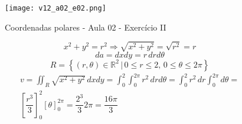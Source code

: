 \begin{enumerate}
	\begin{figure}[htb]
		\caption{Coordenadas polares - Aula 02 - Exercício II}
		\label{v12_a02_e02}
		\centering
		\texttt{[image: v12\_a02\_e02.png]}		
	\end{figure}	
	
	\begin{equation*}
		x^2 + y^2 = r^2 \Rightarrow \sqrt{x^2 + y^2} = \sqrt{r^2} = r
	\end{equation*}
	\begin{equation*}
		da = dx dy = r\, dr d\theta
	\end{equation*}
	\begin{equation*}
		R = \left\{(r, \theta) \in \mathbb{R}^2 \,|\, 0 \leq r \leq 2,\, 0 \leq \theta \leq 2\pi\right\}
	\end{equation*}
	\begin{gather*}
		v = \iint_R \sqrt{x^2 + y^2}\, dxdy = \int_0^2 \int_0^{2\pi} r^2\, drd\theta = \int_0^2 r^2\, dr \int_0^{2\pi} d\theta =\\ \left[\dfrac{r^3}{3}\right]_0^2 [\theta]_0^{2\pi} = \dfrac{2^3}{3}2\pi = \dfrac{16\pi}{3}
	\end{gather*}
\end{enumerate}